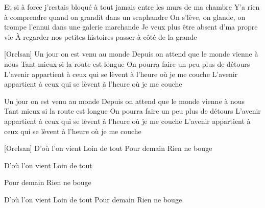 Et si à force j'restais bloqué à tout jamais entre les murs de ma chambre
Y'a rien à comprendre quand on grandit dans un scaphandre
On s'lève, on glande, on trompe l'ennui dans une galerie marchande
Je veux plus être absent d'ma propre vie
À regarder nos petites histoires passer à côté de la grande

[Orelsan]
Un jour on est venu au monde
Depuis on attend que le monde vienne à nous
Tant mieux si la route est longue
On pourra faire un peu plus de détours
L'avenir appartient à ceux qui se lèvent à l'heure où je me couche
L'avenir appartient à ceux qui se lèvent à l'heure où je me couche


Un jour on est venu au monde
Depuis on attend que le monde vienne à nous
Tant mieux si la route est longue
On pourra faire un peu plus de détours
L'avenir appartient à ceux qui se lèvent à l'heure où je me couche
L'avenir appartient à ceux qui se lèvent à l'heure où je me couche

[Orelsan]
D'où l'on vient
Loin de tout
Pour demain
Rien ne bouge

D'où l'on vient
Loin de tout

Pour demain
Rien ne bouge

D'où l'on vient
Loin de tout
Pour demain
Rien ne bouge 